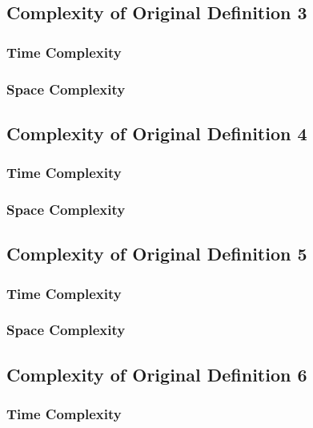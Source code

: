 \documentclass[conference]{IEEEtran}
\begin{document}
\subsection{Complexity of Original Definition 3}

\subsubsection{Time Complexity}

\subsubsection{Space Complexity}

\subsection{Complexity of Original Definition 4}

\subsubsection{Time Complexity}

\subsubsection{Space Complexity}

\subsection{Complexity of Original Definition 5}

\subsubsection{Time Complexity}

\subsubsection{Space Complexity}

\subsection{Complexity of Original Definition 6}

\subsubsection{Time Complexity}
\end{document}
